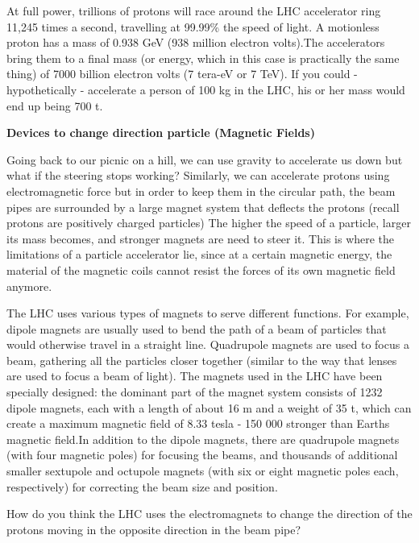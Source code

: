 \;
\noindent
At full power, trillions of protons will race around the LHC accelerator ring 11,245 times a second, travelling at 99.99\% the speed of light. A motionless proton has a mass of 0.938 GeV (938 million electron volts).The accelerators bring them to a final mass (or energy, which in this case is practically the same thing) of 7000 billion electron volts (7 tera-eV or 7 TeV). If you could - hypothetically - accelerate a person of 100 kg in the LHC, his or her mass would end up being 700 t.

\;
\;
\;

\noindent
\textbf{Devices to change direction particle (Magnetic Fields)}

\;
\;

\noindent
Going back to our picnic on a hill, we can use gravity to accelerate us down but what if the steering stops working? Similarly, we can accelerate protons using electromagnetic force but in order to keep them in the circular path, the beam pipes are surrounded by a large magnet system that deflects the protons (recall protons are positively charged particles) The higher the speed of a particle, larger its mass becomes, and stronger magnets are need to steer it. This is where the limitations of a particle accelerator lie, since at a certain magnetic energy, the material of the magnetic coils cannot resist the forces of its own magnetic field anymore. 

\;
\noindent
The LHC uses various types of magnets to serve different functions. For example, dipole magnets are usually used to bend the path of a beam of particles that would otherwise travel in a straight line. Quadrupole magnets are used to focus a beam, gathering all the particles closer together (similar to the way that lenses are used to focus a beam of light). The magnets used in the LHC have been specially designed: the dominant part of the magnet system consists of 1232 dipole magnets, each with a length of about 16 m and a weight of 35 t, which can create a maximum magnetic field of 8.33 tesla - 150 000 stronger than Earths magnetic field.In addition to the dipole magnets, there are quadrupole magnets (with four magnetic poles) for focusing the beams, and thousands of additional smaller sextupole and octupole magnets (with six or eight magnetic poles each, respectively) for correcting the beam size and position. 

\;
\;


\vspace{.2cm}
\begin{minipage}{0.9\textwidth}
\begin{framed}
\begin{exercise}
{How do you think the LHC uses the electromagnets to change the direction of the protons moving in the opposite direction in the beam pipe?}
\end{exercise}
\end{framed}
\end{minipage}
\vspace{.2cm}

